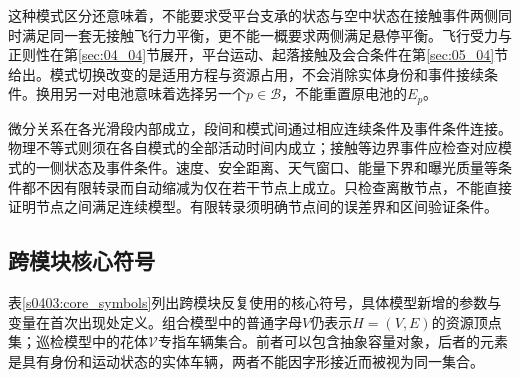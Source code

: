 这种模式区分还意味着，不能要求受平台支承的状态与空中状态在接触事件两侧同时满足同一套无接触飞行力平衡，更不能一概要求两侧满足悬停平衡。飞行受力与正则性在第\ref{sec:04_04}节展开，平台运动、起落接触及会合条件在第\ref{sec:05_04}节给出。模式切换改变的是适用方程与资源占用，不会消除实体身份和事件接续条件。换用另一对电池意味着选择另一个$p\in\mathcal B$，不能重置原电池的$E_p$。

微分关系在各光滑段内部成立，段间和模式间通过相应连续条件及事件条件连接。物理不等式则须在各自模式的全部活动时间内成立；接触等边界事件应检查对应模式的一侧状态及事件条件。速度、安全距离、天气窗口、能量下界和曝光质量等条件都不因有限转录而自动缩减为仅在若干节点上成立。只检查离散节点，不能直接证明节点之间满足连续模型。有限转录须明确节点间的误差界和区间验证条件。

\subsection{跨模块核心符号}

表\ref{s0403:core_symbols}列出跨模块反复使用的核心符号，具体模型新增的参数与变量在首次出现处定义。组合模型中的普通字母$V$仍表示$H=(V,E)$的资源顶点集；巡检模型中的花体$\mathcal V$专指车辆集合。前者可以包含抽象容量对象，后者的元素是具有身份和运动状态的实体车辆，两者不能因字形接近而被视为同一集合。

